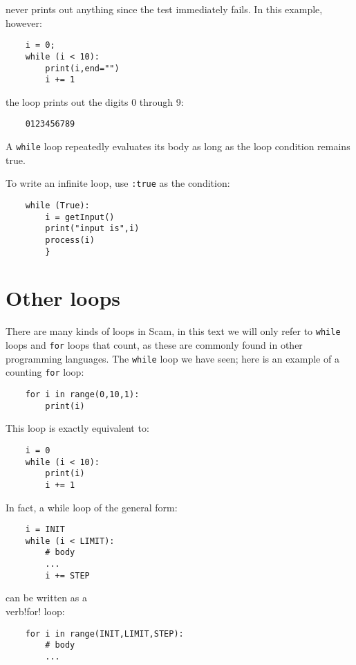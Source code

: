 never prints out anything since the test immediately fails. In this example,
however:

\begin{verbatim}
    i = 0;
    while (i < 10):
        print(i,end="")
        i += 1
\end{verbatim}

the loop prints out the digits 0 through 9:

\begin{verbatim}
    0123456789
\end{verbatim}
    
A {\tt while} loop repeatedly evaluates its body
as long as the loop condition remains true.

To write an infinite loop, use {\tt :true} as the condition:

\begin{verbatim}
    while (True):
        i = getInput()
        print("input is",i)
        process(i)
        }
\end{verbatim}

\section{Other loops}

There are many kinds of loops in Scam, in this text
we will only refer to {\tt while} loops and {\tt for}
loops that count,
as these are commonly found in other programming languages.
The {\tt while} loop we have seen; here is an example of a counting
{\tt for} loop:

\begin{verbatim}
    for i in range(0,10,1):
        print(i)
\end{verbatim}

This loop is exactly equivalent to:

\begin{verbatim}
    i = 0
    while (i < 10):
        print(i)
        i += 1
\end{verbatim}

In fact, a while loop of the general form:

\begin{verbatim}
    i = INIT
    while (i < LIMIT):
        # body
        ...
        i += STEP
\end{verbatim}

can be written as a \\verb!for! loop:

\begin{verbatim}
    for i in range(INIT,LIMIT,STEP):
        # body
        ...
\end{verbatim}

